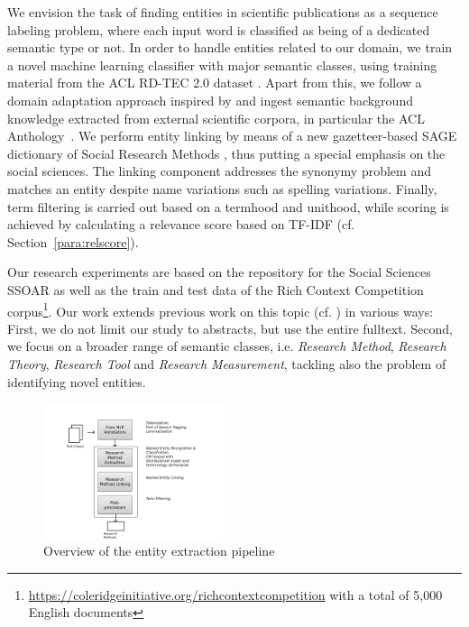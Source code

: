 We envision the task of finding entities in scientific publications as a sequence labeling problem, 
where each input word is classified as being of a dedicated semantic type or not.
In order to handle entities related to our domain, we train a novel machine learning classifier with major semantic classes,
using training material from the ACL RD-TEC 2.0 dataset  \cite{qasemizadeh2016acl}.
Apart from this, we follow a domain adaptation approach inspired by \cite{agerri2016robust} and ingest semantic background knowledge extracted from external scientific corpora, in particular the ACL Anthology~\cite{bird2008acl,gildea2018acl}.
We perform entity linking by means of a new gazetteer-based SAGE dictionary  of Social Research Methods  \cite{lewis2003sage}, thus putting a special emphasis on the social sciences. The linking component addresses the synonymy problem and matches an entity despite name variations such as spelling variations. 
Finally, term filtering is carried out based on a termhood and unithood, while scoring is achieved by calculating a relevance score based on TF-IDF (cf.  Section~\ref{para:relscore}).

Our research experiments are based on the repository for the Social Sciences SSOAR as well as the train and test data of the Rich Context Competition corpus\footnote{\url{https://coleridgeinitiative.org/richcontextcompetition}
with a total of 5,000 English documents}.
Our work extends previous work on this topic (cf. \cite{eckle2013automatically}) in various ways: First, we do not limit our study to abstracts, but use the entire fulltext. Second, we focus on a broader range of semantic classes, 
i.e. \textit{Research Method}, \textit{Research Theory}, \textit{Research Tool} and \textit{Research Measurement}, tackling also the problem of identifying novel entities.
 

\begin{figure}
\label{pipeline}
  \centering
    \includegraphics[width=0.47\textwidth]{figures/research-methods/pipeline.png}
    \caption{Overview of the entity extraction pipeline}
\end{figure}


